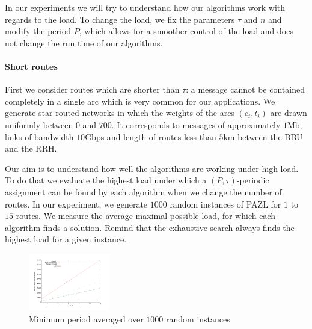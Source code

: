 \documentclass[10pt, conference, letterpaper]{IEEEtran}
\begin{document}


       In our experiments we will try to understand how our algorithms work with regards to the load. To change the load, we fix the parameters $\tau$ and $n$ and modify the period $P$, which allows for a smoother control of the load and does not change the run time of our algorithms.
      

      \paragraph{Short routes}
      
      First we consider routes which are shorter than $\tau$: a message cannot be contained completely in a single arc which is very common for our applications. We generate star routed networks in which the weights of the arcs $(c_t,t_i)$ are drawn uniformly between $0$ and $700$. It corresponds to messages of approximately $1$Mb, links of bandwidth $10$Gbps and length of routes less than $5$km between the BBU and the RRH. 
      
      Our aim is to understand how well the algorithms are working under high load. To do that we evaluate the highest load 
      under which a $(P,\tau)$-periodic assignment can be found by each algorithm when we change the number of routes. 
      In our experiment, we generate $1000$ random instances of PAZL for $1$ to $15$ routes. We measure the average maximal possible load, for which each algorithm finds a solution. Remind that the exhaustive search always finds the highest load for a given instance. 
      
        
      \begin{figure}[H]

      \begin{center}
	 \hspace{-0.5cm}\includegraphics[width=0.315\textwidth]{periode_petite.pdf}
      \end{center}
            \vspace{-0.75cm}
      \caption{Minimum period averaged over $1000$ random instances}
      \end{figure}
      
\end{document}
